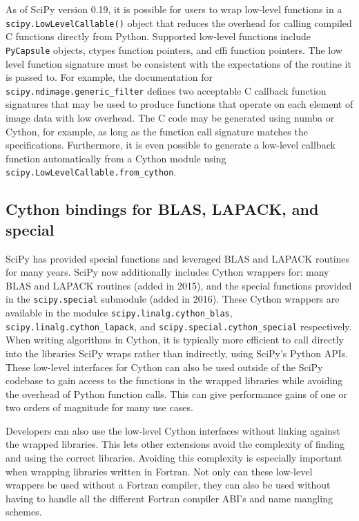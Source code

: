 \documentclass[fleqn,10pt]{wlscirep}
\begin{document}
As of SciPy version 0.19, it is possible for users to wrap low-level functions
in a \texttt{scipy.LowLevelCallable()} object that reduces the overhead for
calling compiled C functions directly from Python.  Supported low-level
functions include \texttt{PyCapsule} objects, ctypes function pointers, and
cffi function pointers. The low level function signature must be consistent
with the expectations of the routine it is passed to. For example, the
documentation for \texttt{scipy.ndimage.generic\_filter} defines two acceptable
C callback function signatures that may be used to produce functions that
operate on each element of image data with low overhead. The C code may be
generated using numba or Cython, for example, as long as the function call
signature matches the specifications. Furthermore, it is even possible to
generate a low-level callback function automatically from a Cython module using
\texttt{scipy.LowLevelCallable.from\_cython}.

\subsection*{Cython bindings for BLAS, LAPACK, and special}

SciPy has provided special functions and leveraged BLAS and
LAPACK\cite{LAPACK} routines for many years. SciPy now additionally
includes Cython\cite{behnel2011cython} wrappers for:
many BLAS and LAPACK routines (added in 2015), and the special functions 
provided in the \texttt{scipy.{\allowbreak}special} submodule (added in 2016).  
These Cython wrappers are available in the modules
\texttt{scipy.{\allowbreak}linalg.{\allowbreak}cython\_blas},
\texttt{scipy.{\allowbreak}linalg.{\allowbreak}cython\_lapack}, and
\texttt{scipy.{\allowbreak}special.{\allowbreak}cython\_special} respectively.
When writing algorithms in Cython, it is typically more efficient to call
directly into the libraries SciPy wraps rather than indirectly, using SciPy's
Python APIs.  These low-level interfaces for Cython can also be used outside of
the SciPy codebase to gain access to the functions in the wrapped libraries
while avoiding the overhead of Python function calls.  This can give
performance gains of one or two orders of magnitude for many use cases.

Developers can also use the low-level Cython interfaces without linking against
the wrapped libraries\cite{blas-lapack-wrappers-scipy-2015}.  This lets other
extensions avoid the complexity of finding and using the correct libraries.
Avoiding this complexity is especially important when wrapping libraries
written in Fortran.  Not only can these low-level wrappers be used without a
Fortran compiler, they can also be used without having to handle all the
different Fortran compiler ABI's and name mangling schemes.
\end{document}
